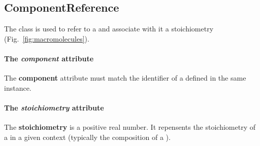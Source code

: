 \subsection{ComponentReference}
\label{sec:component_reference}

The \componentreference{} class is used to refer to a \component{}
and associate with it a stoichiometry (Fig.~\ref{fig:macromolecules}).

\paragraph{The \textit{component} attribute}
The \textbf{component} attribute must match the identifier of a \component{}
defined in the same \rbamacromolecules{} instance.

\paragraph{The \textit{stoichiometry} attribute}
The \textbf{stoichiometry} is a positive real number.
It repensents the stoichiometry of a \component{} in a given context
(typically the composition of a \macromolecule).
